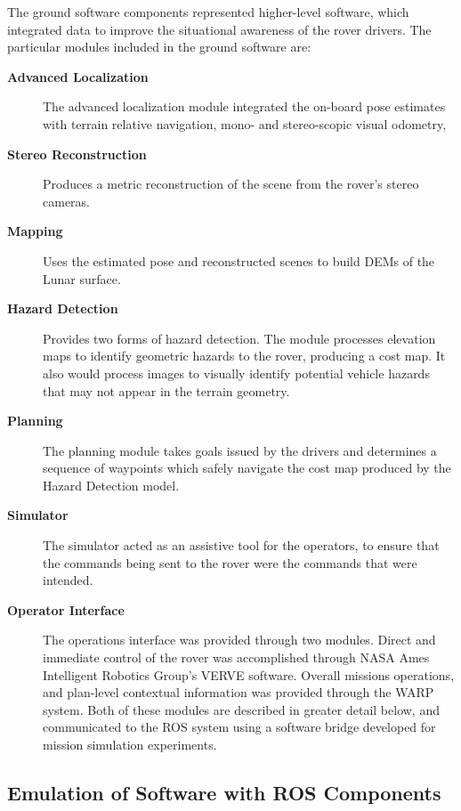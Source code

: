 \documentclass[twocolumn,letterpaper]{IEEEAerospaceCLS}  %
\begin{document}

The ground software components represented higher-level software, which integrated data to improve the situational awareness of the rover drivers.  
The particular modules included in the ground software are:

\begin{description}
\item[\textbf{Advanced Localization}]  The advanced localization module integrated the on-board pose estimates with terrain relative navigation, mono- and stereo-scopic visual odometry, 
\item[\textbf{Stereo Reconstruction}] Produces a metric reconstruction of the scene from the rover's stereo cameras.
\item[\textbf{Mapping}] Uses the estimated pose and reconstructed scenes to build DEMs of the Lunar surface.  
\item[\textbf{Hazard Detection}] Provides two forms of hazard detection.  The module processes elevation maps to identify geometric hazards to the rover, producing a cost map.  It also would process images to visually identify potential vehicle hazards that may not appear in the terrain geometry.
\item[\textbf{Planning}]  The planning module takes goals issued by the drivers and determines a sequence of waypoints which safely navigate the cost map produced by the Hazard Detection model.  
\item[\textbf{Simulator}]  The simulator acted as an assistive tool for the operators, to ensure that the commands being sent to the rover were the commands that were intended.  
\item[\textbf{Operator Interface}]  The operations interface was provided through two modules.  Direct and immediate control of the rover was accomplished through NASA Ames Intelligent Robotics Group's VERVE software.  Overall missions operations, and plan-level contextual information was provided through the WARP system.  Both of these modules are described in greater detail below, and communicated to the ROS system using a software bridge developed for mission simulation experiments.
\end{description}

\subsection{Emulation of Software with ROS Components}
\end{document}

